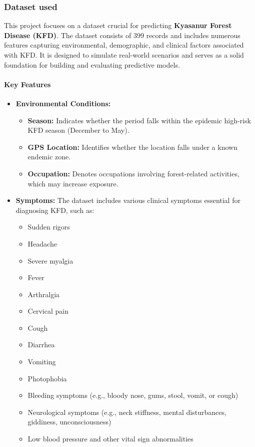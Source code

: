 \documentclass[conference]{IEEEtran}
\begin{document}
\subsubsection{Dataset used}
This project focuses on a dataset crucial for predicting \textbf{Kyasanur Forest Disease (KFD)}. The dataset consists of 399 records and includes numerous features capturing environmental, demographic, and clinical factors associated with KFD. It is designed to simulate real-world scenarios and serves as a solid foundation for building and evaluating predictive models.

\paragraph{Key Features}

\begin{itemize}
    \item \textbf{Environmental Conditions:}
    \begin{itemize}
        \item \textbf{Season:} Indicates whether the period falls within the epidemic high-risk KFD season (December to May).
        \item \textbf{GPS Location:} Identifies whether the location falls under a known endemic zone.
        \item \textbf{Occupation:} Denotes occupations involving forest-related activities, which may increase exposure.
    \end{itemize}

    \item \textbf{Symptoms:} 
    The dataset includes various clinical symptoms essential for diagnosing KFD, such as:
    \begin{itemize}
        \item Sudden rigors
        \item Headache
        \item Severe myalgia
        \item Fever
        \item Arthralgia
        \item Cervical pain
        \item Cough
        \item Diarrhea
        \item Vomiting
        \item Photophobia
        \item Bleeding symptoms (e.g., bloody nose, gums, stool, vomit, or cough)
        \item Neurological symptoms (e.g., neck stiffness, mental disturbances, giddiness, unconsciousness)
        \item Low blood pressure and other vital sign abnormalities
    \end{itemize}


\end{itemize}
\end{document}
